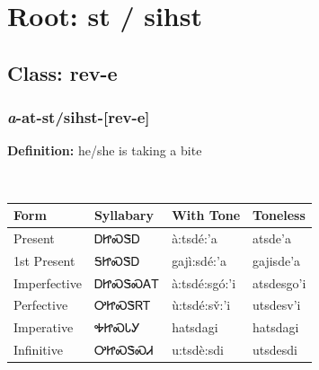 \needspace{4in}
\section*{Root: st / sihst}
\nopagebreak
{}
\needspace{3in}
\subsection*{Class: rev-e}
\nopagebreak
\needspace{2in}
\subsubsection*{\textit{a}{-}at{-}\textbf{st/sihst}{-}[rev-e]}
\nopagebreak
\textbf{Definition: } he/she is taking a bite
\\[0.5em]
\begin{tabularx}{\textwidth}{l X X X}%
\toprule%
\textbf{Form}&\textbf{Syllabary}&\textbf{With Tone}&\textbf{Toneless}\\%
\midrule%
Present&ᎠᏥᏍᏕᎠ&à:tsdé:’a&atsde’a\\%
1st Present&ᎦᏥᏍᏕᎠ&gajì:sdé:’a&gajisde’a\\%
Imperfective&ᎠᏥᏍᏕᏍᎪᎢ&à:tsdé:sgó:’i&atsdesgo’i\\%
Perfective&ᎤᏥᏍᏕᏒᎢ&ù:tsdé:sv̌:’i&utsdesv’i\\%
Imperative&ᎭᏥᏍᏓᎩ&hatsdagi&hatsdagi\\%
Infinitive&ᎤᏥᏍᏕᏍᏗ&u:tsdè:sdi&utsdesdi\\%
\bottomrule%
\end{tabularx}
\\[1em]